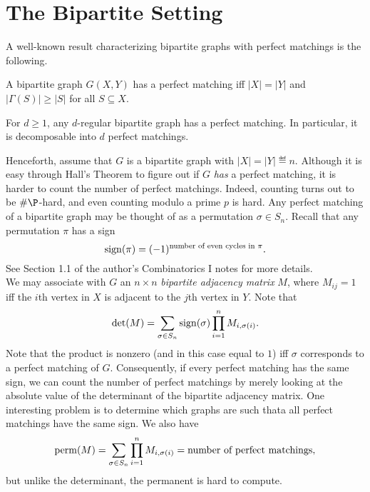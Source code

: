 
\section{The Bipartite Setting}


A well-known result characterizing bipartite graphs with perfect matchings is the following.

\begin{ftheo}
	A bipartite graph $G(X,Y)$ has a perfect matching iff $|X|=|Y|$ and $|\Gamma(S)| \ge |S|$ for all $S \subseteq X$.
\end{ftheo}

\begin{fcor}
	For $d \ge 1$, any $d$-regular bipartite graph has a perfect matching. In particular, it is decomposable into $d$ perfect matchings.
\end{fcor}

Henceforth, assume that $G$ is a bipartite graph with $|X|=|Y|\eqdef n$. Although it is easy through Hall's Theorem to figure out if $G$ \emph{has} a perfect matching, it is harder to count the number of perfect matchings. Indeed, counting turns out to be $\#\P$-hard, and even counting modulo a prime $p$ is hard. Any perfect matching of a bipartite graph may be thought of as a permutation $\sigma \in S_n$. Recall that any permutation $\pi$ has a sign
\[ \operatorname{sign}(\pi) = (-1)^{\text{number of even cycles in $\pi$}}. \]
See Section 1.1 of the author's Combinatorics I notes for more details.\\

We may associate with $G$ an $n \times n$ \emph{bipartite adjacency matrix} $M$, where $M_{ij} = 1$ iff the $i$th vertex in $X$ is adjacent to the $j$th vertex in $Y$. Note that
\[ \det(M) = \sum_{\sigma \in S_n} \operatorname{sign}(\sigma) \prod_{i=1}^n M_{i,\sigma(i)}. \]
Note that the product is nonzero (and in this case equal to $1$) iff $\sigma$ corresponds to a perfect matching of $G$. Consequently, if every perfect matching has the same sign, we can count the number of perfect matchings by merely looking at the absolute value of the determinant of the bipartite adjacency matrix. One interesting problem is to determine which graphs are such thata all perfect matchings have the same sign. We also have
\[ \operatorname{perm}(M) = \sum_{\sigma \in S_n} \prod_{i=1}^n M_{i,\sigma(i)} = \text{number of perfect matchings}, \]
but unlike the determinant, the permanent is hard to compute.\\

